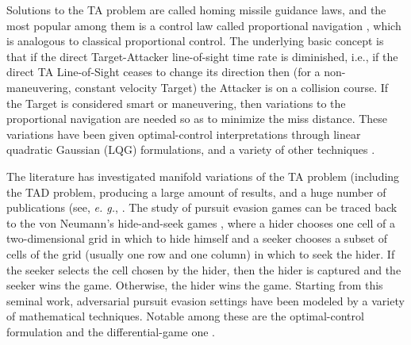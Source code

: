 Solutions to the TA problem are called homing missile guidance laws, and the most popular among them is a control law called proportional navigation \cite{adler1956missile,becker1990closed,ghose1994generalization}, which is analogous to classical proportional control. The underlying basic concept is that if the direct Target-Attacker line-of-sight time rate is diminished, i.e., if the direct TA Line-of-Sight ceases to change its direction then (for a non-maneuvering, constant velocity Target) the Attacker is on a collision course. If the Target is considered smart or maneuvering, then variations to the proportional navigation are needed so as to minimize the miss distance. These variations have been given optimal-control interpretations through linear quadratic Gaussian (LQG) formulations, and a variety of other techniques \cite{gutman2012optimal,shinar1980three,nesline2012new,anderson2012comparison,pastrick2012guidance,rodin1987pursuit,rodin1989pursuit,lin1991modern,cochran1991analytical,le1998determining,creaser1998generation,siouris2004missile,lechevin2004lyapunov,lee2007guidance,breivik2008guidance,rusnak2008guidance, shinar2009meeting,lin2010development,shneydor1998missile,pham2012fuzzy,white2012advances,li2014fuzzy,cho2014optimal,grinfeld2015minimal,zarchan1999ballistic,zarchan2000tracking,zarchan2011kill,pearce2013tactical}.

The literature has investigated manifold variations of the TA problem (including the TAD problem, producing a large amount of results, and a huge number of publications (see, \textit{e. g.}, \cite{rodin1987pursuit,rodin1989pursuit,pearce2013tactical,chung2011search,weiss2017combined,garcia2017optimal}. The study of pursuit evasion games can be traced back to the von Neumann’s hide-and-seek games \cite{flood1972hide}, where a hider chooses one cell of a two-dimensional grid in which to hide himself and a seeker chooses a subset of cells of the grid (usually one row and one column) in which to seek the hider. If the seeker selects the cell chosen by the hider, then the hider is captured and the seeker wins the game. Otherwise, the hider wins the game. Starting from this seminal work, adversarial pursuit evasion settings have been modeled by a variety of mathematical techniques. Notable among these are the optimal-control formulation and the differential-game one \cite{anderson2012comparison,turetsky2003missile,gutman20103d}. 


